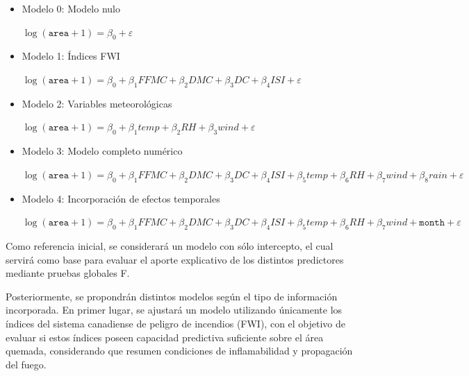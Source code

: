 \begin{itemize}
    \item{Modelo 0: Modelo nulo}
        \begin{center}
            $\log(\texttt{area}+1)=\beta_0+\varepsilon$
        \end{center}

    \item{Modelo 1: Índices FWI}
        \begin{center}
           $\log(\texttt{area}+1)=
            \beta_0+
            \beta_1 FFMC+
            \beta_2 DMC+
            \beta_3 DC+
            \beta_4 ISI+
            \varepsilon
            $
        \end{center}
        
    \item{Modelo 2: Variables meteorológicas}
        \begin{center}
           $\log(\texttt{area}+1)=
            \beta_0+
            \beta_1 temp+
            \beta_2 RH+
            \beta_3 wind+
            \varepsilon
            $
        \end{center}
    
    \item{Modelo 3: Modelo completo numérico}
        \begin{center}
            $\log(\texttt{area}+1)=
            \beta_0+
            \beta_1 FFMC+
            \beta_2 DMC+
            \beta_3 DC+
            \beta_4 ISI+
            \beta_5 temp+
            \beta_6 RH+
            \beta_7 wind+
            \beta_8 rain+
            \varepsilon
            $
        \end{center}
    
    \item{Modelo 4: Incorporación de efectos temporales}
    \begin{center}
        $\log(\texttt{area}+1)=
        \beta_0+
        \beta_1 FFMC+
        \beta_2 DMC+
        \beta_3 DC+
        \beta_4 ISI+
        \beta_5 temp+
        \beta_6 RH+
        \beta_7 wind+
        \texttt{month}+
        \varepsilon
        $
    \end{center}
\end{itemize}

Como referencia inicial, se considerará un modelo con sólo intercepto, el cual servirá como base para evaluar el aporte explicativo de los distintos predictores mediante pruebas globales F.

Posteriormente, se propondrán distintos modelos según el tipo de información incorporada. En primer lugar, se ajustará un modelo utilizando únicamente los índices del sistema canadiense de peligro de incendios (FWI), con el objetivo de evaluar si estos índices poseen capacidad predictiva suficiente sobre el área quemada, considerando que resumen condiciones de inflamabilidad y propagación del fuego.

